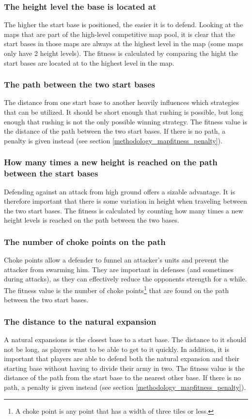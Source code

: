 	\subsubsection*{The height level the base is located at}
	The higher the start base is positioned, the easier it is to defend. Looking at the maps that are part of the high-level competitive map pool, it is clear that the start bases in those maps are always at the highest level in the map (some maps only have 2 height levels). The fitness is calculated by comparing the hight the start bases are located at to the highest level in the map. 

	\subsubsection*{The path between the two start bases}
	The distance from one start base to another heavily influences which strategies that can be utilized. It should be short enough that rushing is possible, but long enough that rushing is not the only possible winning strategy. The fitness value is the distance of the path between the two start bases. If there is no path, a penalty is given instead (see section \ref{methodology_mapfitness_penalty}).

	\subsubsection*{How many times a new height is reached on the path between the start bases}
	Defending against an attack from high ground offers a sizable advantage. It is therefore important that there is some variation in height when traveling between the two start bases. The fitness is calculated by counting how many times a new height levels is reached on the path between the two bases.

	\subsubsection*{The number of choke points on the path}
	Choke points allow a defender to funnel an attacker's units and prevent the attacker from swarming him. They are important in defenses (and sometimes during attacks), as they can effectively reduce the opponents strength for a while. The fitness value is the number of choke points\footnote{A choke point is any point that has a width of three tiles or less.} that are found on the path between the two start bases.

	\subsubsection*{The distance to the natural expansion}
	A natural expansions is the closest base to a start base. The distance to it should not be long, as players want to be able to get to it quickly. In addition, it is important that players are able to defend both the natural expansion and their starting base without having to divide their army in two. The fitness value is the distance of the path from the start base to the nearest other base. If there is no path, a penalty is given instead (see section \ref{methodology_mapfitness_penalty}).

